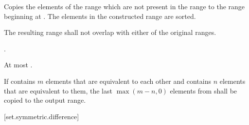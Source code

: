 \begin{itemdescr}
\pnum
\effects
Copies the elements of the range
which are not present in the range
to the range beginning at
.
The elements in the constructed range are sorted.

\pnum
\requires
The resulting range shall not overlap with either of the original ranges.

\pnum
\returns
{}.

\pnum
\complexity
At most
.

\pnum
\notes
If
contains $m$
elements that are equivalent to each other and
contains $n$
elements that are equivalent to them, the last
$\max(m - n, 0)$
elements from
shall be copied to the output range.
\end{itemdescr}

[set.symmetric.difference]{}

